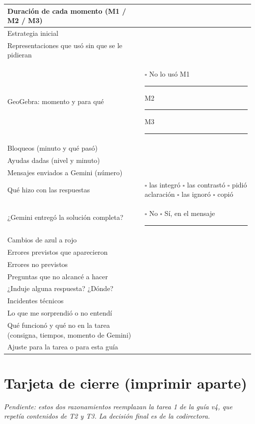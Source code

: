 \documentclass[11pt,letterpaper]{article}
\newcommand{\cas}{$\square$}
\begin{document}
\renewcommand{\arraystretch}{1.3}
\begin{tabularx}{\linewidth}{@{}p{5.6cm}X@{}}
\toprule
Duración de cada momento (M1 / M2 / M3) & \\ \midrule
Estrategia inicial & \\[0.35cm] \midrule
Representaciones que usó sin que se le pidieran & \\ \midrule
GeoGebra: momento y para qué & \cas{} No lo usó \enspace M1 \rule{1.6cm}{0.4pt} \enspace M2 \rule{1.6cm}{0.4pt} \enspace M3 \rule{1.6cm}{0.4pt} \\ \midrule
Bloqueos (minuto y qué pasó) & \\[0.35cm] \midrule
Ayudas dadas (nivel y minuto) & \\ \midrule
Mensajes enviados a Gemini (número) & \\ \midrule
Qué hizo con las respuestas & \cas{} las integró \enspace \cas{} las contrastó \enspace \cas{} pidió aclaración \enspace \cas{} las ignoró \enspace \cas{} copió \\ \midrule
¿Gemini entregó la solución completa? & \cas{} No \enspace \cas{} Sí, en el mensaje \rule{1cm}{0.4pt} \\ \midrule
Cambios de azul a rojo & \\[0.35cm] \midrule
Errores previstos que aparecieron & \\ \midrule
Errores no previstos & \\ \midrule
Preguntas que no alcancé a hacer & \\ \midrule
¿Induje alguna respuesta? ¿Dónde? & \\ \midrule
Incidentes técnicos & \\ \midrule
Lo que me sorprendió o no entendí & \\[0.5cm] \midrule
Qué funcionó y qué no en la tarea (consigna, tiempos, momento de Gemini) & \\[0.5cm] \midrule
Ajuste para la tarea o para esta guía & \\[0.5cm] \bottomrule
\end{tabularx}


\newpage
\thispagestyle{empty}
\section*{Tarjeta de cierre \normalfont\small(imprimir aparte)}

\textit{Pendiente: estos dos razonamientos reemplazan la tarea 1 de la guía v4, que repetía contenidos de T2 y T3. La decisión final es de la codirectora.}
\end{document}
